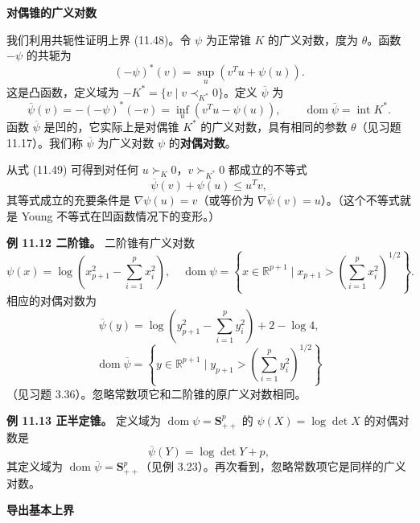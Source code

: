 \documentclass[UTF8, 12pt, fontset=fandol, oneside]{ctexart}
\begin{document}
\noindent\textbf{对偶锥的广义对数}

我们利用共轭性证明上界 (11.48)。令 $\psi$ 为正常锥 $K$ 的广义对数，度为 $\theta$。函数 $-\psi$ 的共轭为
\[
(-\psi)^\ast(v)=\sup_u(v^Tu+\psi(u)).
\]
这是凸函数，定义域为 $-K^\ast=\{v\mid v\prec_{K^\ast}0\}$。定义 $\overline{\psi}$ 为
\begin{equation}
\overline{\psi}(v)=-(-\psi)^\ast(-v)=\inf_u(v^Tu-\psi(u)),\qquad
\operatorname{dom}\overline{\psi}=\operatorname{int}K^\ast.
\tag{11.49}
\end{equation}
函数 $\overline{\psi}$ 是凹的，它实际上是对偶锥 $K^\ast$ 的广义对数，具有相同的参数 $\theta$（见习题 11.17）。我们称 $\overline{\psi}$ 为广义对数 $\psi$ 的\textbf{对偶对数}。

从式 (11.49) 可得到对任何 $u\succ_K0$，$v\succ_{K^\ast}0$ 都成立的不等式
\begin{equation}
\overline{\psi}(v)+\psi(u)\leq u^Tv,
\tag{11.50}
\end{equation}
其等式成立的充要条件是 $\nabla\psi(u)=v$（或等价为 $\nabla\overline{\psi}(v)=u$）。（这个不等式就是 Young 不等式在凹函数情况下的变形。）

\noindent\textbf{例 11.12 二阶锥。} 二阶锥有广义对数
\[
\psi(x)=\log\left(x_{p+1}^2-\sum_{i=1}^p x_i^2\right),\quad
\operatorname{dom}\psi=\left\{x\in\mathbb{R}^{p+1}\mid x_{p+1}>\left(\sum_{i=1}^p x_i^2\right)^{1/2}\right\}.
\]
相应的对偶对数为
\[
\overline{\psi}(y)=\log\left(y_{p+1}^2-\sum_{i=1}^p y_i^2\right)+2-\log4,
\]
\[
\operatorname{dom}\overline{\psi}=\left\{y\in\mathbb{R}^{p+1}\mid y_{p+1}>\left(\sum_{i=1}^p y_i^2\right)^{1/2}\right\}
\]
（见习题 3.36）。忽略常数项它和二阶锥的原广义对数相同。

\noindent\textbf{例 11.13 正半定锥。} 定义域为 $\operatorname{dom}\psi=\mathbf{S}_{++}^p$ 的 $\psi(X)=\log\det X$ 的对偶对数是
\[
\overline{\psi}(Y)=\log\det Y+p,
\]
其定义域为 $\operatorname{dom}\overline{\psi}=\mathbf{S}_{++}^p$（见例 3.23）。再次看到，忽略常数项它是同样的广义对数。

\noindent\textbf{导出基本上界}
\end{document}
